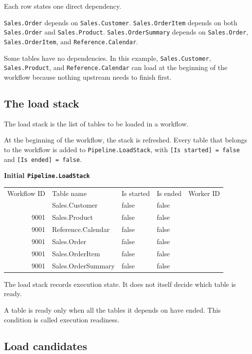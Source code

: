 \documentclass[10pt,openany,10pt]{book}
\newcounter{none}
\let\podeToprule\toprule
\let\podeMidrule\midrule
\let\podeBottomrule\bottomrule
\renewcommand{\toprule}{\arrayrulecolor{pbiGrid}\podeToprule}
\renewcommand{\midrule}{\arrayrulecolor{pbiGrid}\podeMidrule}
\renewcommand{\bottomrule}{\arrayrulecolor{pbiGrid}\podeBottomrule}
\begin{document}
Each row states one direct dependency.

\texttt{Sales.Order} depends on \texttt{Sales.Customer}.
\texttt{Sales.OrderItem} depends on both \texttt{Sales.Order} and
\texttt{Sales.Product}. \texttt{Sales.OrderSummary} depends on
\texttt{Sales.Order}, \texttt{Sales.OrderItem}, and
\texttt{Reference.Calendar}.

Some tables have no dependencies. In this example,
\texttt{Sales.Customer}, \texttt{Sales.Product}, and
\texttt{Reference.Calendar} can load at the beginning of the workflow
because nothing upstream needs to finish first.

\subsection{The load stack}\label{the-load-stack}

The load stack is the list of tables to be loaded in a workflow.

At the beginning of the workflow, the stack is refreshed. Every table
that belongs to the workflow is added to \texttt{Pipeline.LoadStack},
with \texttt{{[}Is\ started{]}\ =\ false} and
\texttt{{[}Is\ ended{]}\ =\ false}.

\textbf{Initial \texttt{Pipeline.LoadStack}}

{\def\LTcaptype{none} %
\begin{longtable}[]{@{}rllll@{}}
\toprule\noalign{}
Workflow ID & Table name & Is started & Is ended & Worker ID \\
\midrule\noalign{}
\endhead
\bottomrule\noalign{}
\endlastfoot
9001 & Sales.Customer & false & false & \\
9001 & Sales.Product & false & false & \\
9001 & Reference.Calendar & false & false & \\
9001 & Sales.Order & false & false & \\
9001 & Sales.OrderItem & false & false & \\
9001 & Sales.OrderSummary & false & false & \\
\end{longtable}
}

The load stack records execution state. It does not itself decide which
table is ready.

A table is ready only when all the tables it depends on have ended. This
condition is called execution readiness.

\subsection{Load candidates}\label{load-candidates}
\end{document}

